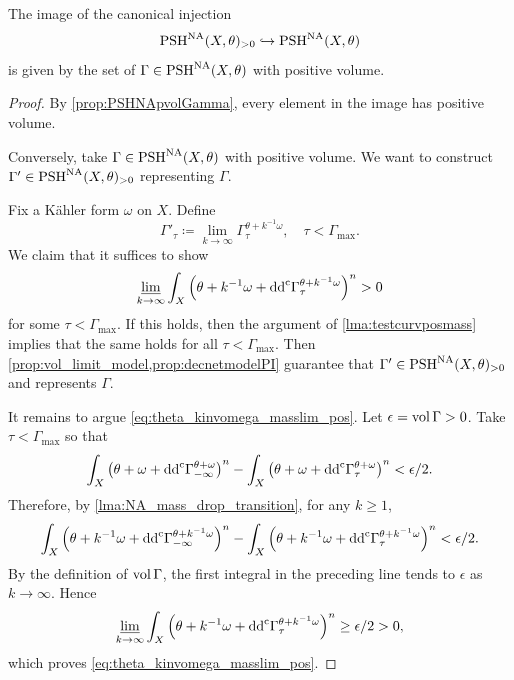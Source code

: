 \begin{lemma}\label{lma:positivemasspart}
The image of the canonical injection
\[
\mathrm{PSH}^{\mathrm{NA}}(X,\theta)_{>0}\hookrightarrow \mathrm{PSH}^{\mathrm{NA}}(X,\theta)
\]
is given by the set of $\Gamma\in \mathrm{PSH}^{\mathrm{NA}}(X,\theta)$ with positive volume.
\end{lemma}
\begin{proof}
By \cref{prop:PSHNApvolGamma}, every element in the image has positive volume.

Conversely, take $\Gamma\in \mathrm{PSH}^{\mathrm{NA}}(X,\theta)$ with positive volume. We want to construct $\Gamma'\in \mathrm{PSH}^{\mathrm{NA}}(X,\theta)_{>0}$ representing $\Gamma$.

Fix a K\"ahler form $\omega$ on $X$. Define
\begin{equation}\label{eq:Gamma'_tau}
    \Gamma'_{\tau}\coloneqq \lim_{k\to\infty}\Gamma^{\theta+k^{-1}\omega}_{\tau},\quad \tau<\Gamma_{\max}.
\end{equation}
We claim that it suffices to show
\begin{equation}\label{eq:theta_kinvomega_masslim_pos}
    \varliminf_{k\to\infty}\int_X \left(\theta+k^{-1}\omega+\mathrm{dd}^{\mathrm{c}}\Gamma^{\theta+k^{-1}\omega}_{\tau}\right)^n>0
\end{equation}
for some $\tau<\Gamma_{\max}$. If this holds, then the argument of \cref{lma:testcurvposmass} implies that the same holds for all $\tau<\Gamma_{\max}$. Then \cref{prop:vol_limit_model,prop:decnetmodelPI} guarantee that $\Gamma'\in \mathrm{PSH}^{\mathrm{NA}}(X,\theta)_{>0}$ and represents $\Gamma$.

It remains to argue \eqref{eq:theta_kinvomega_masslim_pos}.
Let $\epsilon=\operatorname{vol} \Gamma>0$.
Take $\tau<\Gamma_{\max}$ so that
\[
\int_X \left(\theta+\omega+\mathrm{dd}^{\mathrm{c}}\Gamma^{\theta+\omega}_{-\infty}\right)^n-\int_X \left(\theta+\omega+\mathrm{dd}^{\mathrm{c}}\Gamma^{\theta+\omega}_{\tau}\right)^n<\epsilon/2.
\]
Therefore, by \cref{lma:NA_mass_drop_transition}, for any $k\geq 1$,
\[
\int_X \left(\theta+k^{-1}\omega+\mathrm{dd}^{\mathrm{c}}\Gamma^{\theta+k^{-1}\omega}_{-\infty}\right)^n-\int_X \left(\theta+k^{-1}\omega+\mathrm{dd}^{\mathrm{c}}\Gamma^{\theta+k^{-1}\omega}_{\tau}\right)^n<\epsilon/2.
\]
By the definition of $\operatorname{vol}\Gamma$, the first integral in the preceding line tends to $\epsilon$ as $k\to\infty$. Hence
\[
    \varliminf_{k\to\infty}\int_X \left(\theta+k^{-1}\omega+\mathrm{dd}^{\mathrm{c}}\Gamma^{\theta+k^{-1}\omega}_{\tau}\right)^n\geq \epsilon/2>0,
\]
which proves \eqref{eq:theta_kinvomega_masslim_pos}.
\end{proof}


